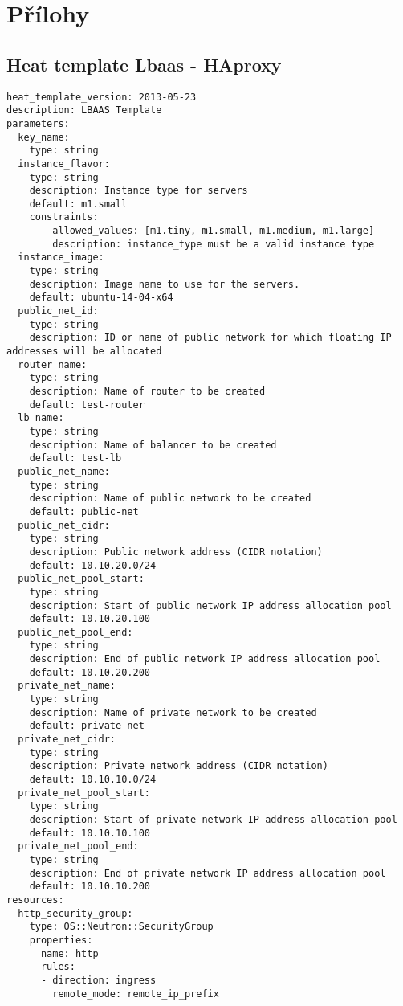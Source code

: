 \thispagestyle{empty}  \renewcommand{\appendixname}{P\v{r}iloha}%
\part*{Přílohy} %
\appendix
\chapter{Heat template Lbaas - HAproxy}

\begin{lstlisting}
heat_template_version: 2013-05-23
description: LBAAS Template
parameters:
  key_name:
    type: string
  instance_flavor:
    type: string
    description: Instance type for servers
    default: m1.small
    constraints:
      - allowed_values: [m1.tiny, m1.small, m1.medium, m1.large]
        description: instance_type must be a valid instance type
  instance_image:
    type: string
    description: Image name to use for the servers.
    default: ubuntu-14-04-x64
  public_net_id:
    type: string
    description: ID or name of public network for which floating IP addresses will be allocated
  router_name:
    type: string
    description: Name of router to be created
    default: test-router
  lb_name:
    type: string
    description: Name of balancer to be created
    default: test-lb
  public_net_name:
    type: string
    description: Name of public network to be created
    default: public-net
  public_net_cidr:
    type: string
    description: Public network address (CIDR notation)
    default: 10.10.20.0/24
  public_net_pool_start:
    type: string
    description: Start of public network IP address allocation pool
    default: 10.10.20.100
  public_net_pool_end:
    type: string
    description: End of public network IP address allocation pool
    default: 10.10.20.200
  private_net_name:
    type: string
    description: Name of private network to be created
    default: private-net
  private_net_cidr:
    type: string
    description: Private network address (CIDR notation)
    default: 10.10.10.0/24
  private_net_pool_start:
    type: string
    description: Start of private network IP address allocation pool
    default: 10.10.10.100
  private_net_pool_end:
    type: string
    description: End of private network IP address allocation pool
    default: 10.10.10.200
resources:
  http_security_group:
    type: OS::Neutron::SecurityGroup
    properties:
      name: http
      rules:
      - direction: ingress
        remote_mode: remote_ip_prefix

\end{lstlisting}
